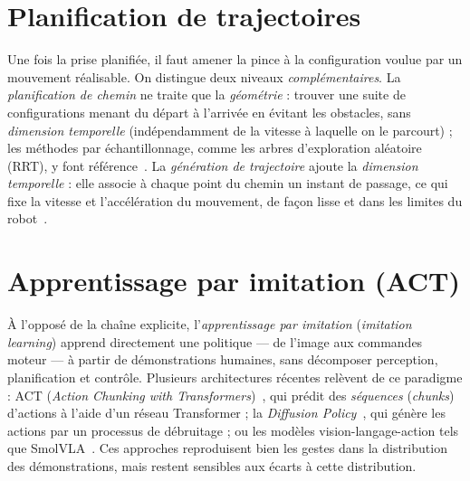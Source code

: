 
\section{Planification de trajectoires}

Une fois la prise planifiée, il faut amener la pince à la configuration voulue par un mouvement réalisable. On distingue deux niveaux \emph{complémentaires}. La \emph{planification de chemin} ne traite que la \emph{géométrie} : trouver une suite de configurations menant du départ à l'arrivée en évitant les obstacles, sans \emph{dimension temporelle} (indépendamment de la vitesse à laquelle on le parcourt) ; les méthodes par échantillonnage, comme les arbres d'exploration aléatoire (RRT), y font référence~\cite{lavalle_planning_2006}. La \emph{génération de trajectoire} ajoute la \emph{dimension temporelle} : elle associe à chaque point du chemin un instant de passage, ce qui fixe la vitesse et l'accélération du mouvement, de façon lisse et dans les limites du robot~\cite{siciliano_robotics_2009}.


\section{Apprentissage par imitation (ACT)}

À l'opposé de la chaîne explicite, l'\emph{apprentissage par imitation} (\emph{imitation learning}) apprend directement une politique --- de l'image aux commandes moteur --- à partir de démonstrations humaines, sans décomposer perception, planification et contrôle. Plusieurs architectures récentes relèvent de ce paradigme : ACT (\emph{Action Chunking with Transformers})~\cite{zhao_act_2023}, qui prédit des \emph{séquences} (\emph{chunks}) d'actions à l'aide d'un réseau Transformer ; la \emph{Diffusion Policy}~\cite{chi_visuomotor_nodate}, qui génère les actions par un processus de débruitage ; ou les modèles vision-langage-action tels que SmolVLA~\cite{shukor_smolvla_2025}. Ces approches reproduisent bien les gestes dans la distribution des démonstrations, mais restent sensibles aux écarts à cette distribution.

